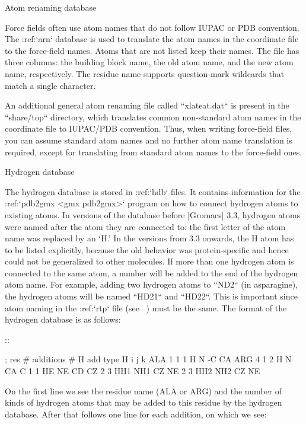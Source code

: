 Atom renaming database
~~~~~~~~~~~~~~~~~~~~~~

Force fields often use atom names that do not follow IUPAC or PDB
convention. The :ref:`arn` database is used to translate the
atom names in the coordinate file to the force-field names. Atoms that
are not listed keep their names. The file has three columns: the
building block name, the old atom name, and the new atom name,
respectively. The residue name supports question-mark wildcards that
match a single character.

An additional general atom renaming file called
``xlateat.dat`` is present in the ``share/top``
directory, which translates common non-standard atom names in the
coordinate file to IUPAC/PDB convention. Thus, when writing force-field
files, you can assume standard atom names and no further atom name
translation is required, except for translating from standard atom names
to the force-field ones.

Hydrogen database
~~~~~~~~~~~~~~~~~

The hydrogen
database
is stored in :ref:`hdb` files. It contains information for the
:ref:`pdb2gmx <gmx pdb2gmx>` program on how to connect hydrogen atoms to
existing atoms. In versions of the database before |Gromacs| 3.3, hydrogen
atoms were named after the atom they are connected to: the first letter
of the atom name was replaced by an ‘H.’ In the versions from 3.3
onwards, the H atom has to be listed explicitly, because the old
behavior was protein-specific and hence could not be generalized to
other molecules. If more than one hydrogen atom is connected to the same
atom, a number will be added to the end of the hydrogen atom name. For
example, adding two hydrogen atoms to ``ND2`` (in asparagine), the
hydrogen atoms will be named ``HD21`` and ``HD22``. This is important
since atom naming in the :ref:`rtp` file
(see 
) must be the same. The format of the
hydrogen database is as follows:

::

    ; res   # additions
            # H add type    H       i       j       k
    ALA     1
            1       1       H       N       -C      CA
    ARG     4
            1       2       H       N       CA      C
            1       1       HE      NE      CD      CZ
            2       3       HH1     NH1     CZ      NE
            2       3       HH2     NH2     CZ      NE

On the first line we see the residue name (ALA or ARG) and the number of
kinds of hydrogen atoms that may be added to this residue by the
hydrogen database. After that follows one line for each addition, on
which we see:

